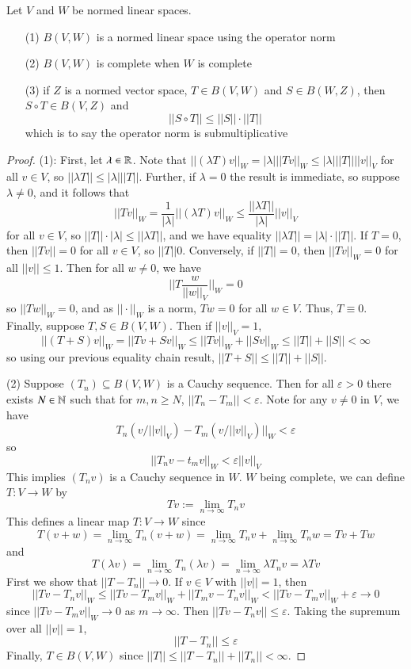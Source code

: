 \begin{prop}
    Let $V$ and $W$ be normed linear spaces. \begin{itemize}
        \item[(1)] $B(V,W)$ is a normed linear space using the operator norm
        \item[(2)] $B(V,W)$ is complete when $W$ is complete
        \item[(3)] if $Z$ is a normed vector space, $T \in B(V,W)$ and $S \in B(W,Z)$, then $S\circ T \in B(V,Z)$ and $$||S\circ T|| \leq ||S||\cdot||T||$$
            which is to say the operator norm is submultiplicative
    \end{itemize}
\end{prop}
\begin{proof}
    (1): First, let $\lambda \in \mathbb R$. Note that $||(\lambda T)v||_W = |\lambda|||Tv||_W \leq |\lambda|||T||||v||_V$ for all $v \in V$, so $||\lambda T|| \leq |\lambda|||T||$. Further, if $\lambda = 0$ the result is immediate, so suppose $\lambda \neq 0$, and it follows that $$||Tv||_W = \frac{1}{|\lambda|}||(\lambda T)v||_W \leq \frac{||\lambda T||}{|\lambda|}||v||_V$$ for all $v \in V$, so $|| T||\cdot|\lambda| \leq ||\lambda T||$, and we have equality $||\lambda T|| = |\lambda|\cdot||T||$. If $T = 0$, then $||Tv|| = 0$ for all $v \in V$, so $||T|| 0$. Conversely, if $||T|| = 0$, then $||Tv||_W = 0$ for all $||v|| \leq 1$. Then for all $w \neq 0$, we have $$||T\frac{w}{||w||_V}||_W = 0$$ so $||Tw||_W = 0$, and as $||\cdot||_W$ is a norm, $Tw = 0$ for all $w \in V$. Thus, $T \equiv 0$. Finally, suppose $T,S \in B(V,W)$. Then if $||v||_V = 1$, $$||(T+S)v||_W = ||Tv+Sv||_W \leq ||Tv||_W+||Sv||_W \leq ||T|| + ||S|| < \infty$$ so using our previous equality chain result, $||T+S|| \leq ||T|| + ||S||$.

    (2) Suppose $(T_n) \subseteq B(V,W)$ is a Cauchy sequence. Then for all $\varepsilon > 0$ there exists $N \in \mathbb N$ such that for $m,n \geq N$, $||T_n - T_m || < \varepsilon$. Note for any $v\neq 0$ in $V$, we have $$T_n(v/||v||_V) - T_m(v/||v||_V)||_W < \varepsilon$$ so $$||T_nv - t_mv||_W <\varepsilon||v||_V$$ This implies $(T_nv)$ is a Cauchy sequence in $W$. $W$ being complete, we can define $T:V\rightarrow W$ by $$Tv:= \lim\limits_{n\rightarrow \infty}T_nv$$ This defines a linear map $T:V\rightarrow W$ since $$T(v+w) = \lim\limits_{n\rightarrow\infty}T_n(v+w) = \lim\limits_{n\rightarrow \infty}T_nv + \lim\limits_{n\rightarrow \infty}T_nw = Tv + Tw$$ and $$T(\lambda v) = \lim\limits_{n\rightarrow \infty}T_n(\lambda v) = \lim\limits_{n\rightarrow \infty}\lambda T_nv = \lambda Tv$$ First we show that $||T-T_n||\rightarrow 0$. If $v \in V$ with $||v|| = 1$, then $$||Tv - T_nv||_W \leq ||Tv - T_mv||_W + ||T_mv-T_nv||_W < ||Tv - T_mv||_W+\varepsilon\rightarrow 0$$ since $||Tv-T_mv||_W\rightarrow 0$ as $m\rightarrow \infty$. Then $||Tv-T_nv|| \leq \varepsilon$. Taking the supremum over all $||v|| = 1$, $$||T-T_n||\leq \varepsilon$$ Finally, $T \in B(V,W)$ since $||T|| \leq ||T-T_n|| + ||T_n|| <\infty$.


\end{proof}
